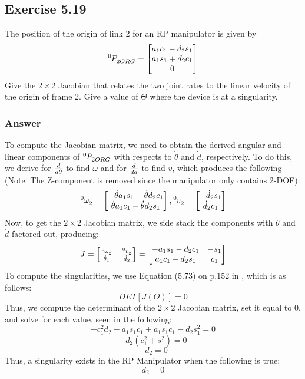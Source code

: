 \documentclass[10pt]{article}
\begin{document}
\subsection*{Exercise 5.19}
The position of the origin of link 2 for an RP manipulator is given by
\[
\tensor*[^{0}]{P}{_{2ORG}} =
\begin{bmatrix}
    a_{1}c_{1} - d_{2}s_{1}     \\
    a_{1}s_{1} + d_{2}c_{1}     \\
    0
\end{bmatrix}
\]
Give the \(2 \times 2\) Jacobian that relates the two joint rates to the linear velocity of the origin of frame {2}. Give a value of \(\Theta\) where the device is at a singularity.
\subsubsection*{Answer}
To compute the Jacobian matrix, we need to obtain the derived angular and linear components of \(\tensor*[^{0}]{P}{_{2ORG}}\) with respects to \(\dot{\theta}\) and \(\dot{d}\), respectively.  To do this, we derive for \({d}\over{d\theta}\) to find \(\omega\) and for \({d}\over{dd}\) to find \(v\), which produces the following (Note: The Z-component is removed since the manipulator only contains 2-DOF):
\[
\tensor*[^{0}]{\omega}{_{2}} =
\begin{bmatrix}
    -\dot{\theta}a_{1}s_{1} - \dot{\theta}d_{2}c_{1}     \\
    \dot{\theta}a_{1}c_{1} - \dot{\theta}d_{2}s_{1}
\end{bmatrix},
\tensor*[^{0}]{v}{_{2}} =
\begin{bmatrix}
    - \dot{d}_{2}s_{1}     \\
    \dot{d}_{2}c_{1}
\end{bmatrix}
\]
Now, to get the \(2 \times 2\) Jacobian matrix, we side stack the components with \(\dot{\theta}\) and \(\dot{d}\) factored out, producing:
\[
J =
\begin{bmatrix}
    \tensor*[^{0}]{\omega}{_{2}}  \over {\dot{\theta}_{1}}  &
    \tensor*[^{0}]{v}{_{2}} \over \dot{d}_{2}
\end{bmatrix} =
\begin{bmatrix}
    -a_{1}s_{1} - d_{2}c_{1} & -s_{1} \\
    a_{1}c_{1} - d_{2}s_{1}  & c_{1}
\end{bmatrix}
\]
To compute the singularities, we use Equation (5.73) on p.152 in \cite{textbook}, which is as follows:
\[DET[J(\Theta)] = 0\]
Thus, we compute the determinant of the \(2 \times 2\) Jacobian matrix, set it equal to 0, and solve for each value, seen in the following:
\[
-c_{1}^2d_{2} - a_{1}s_{1}c_{1} + a_{1}s_{1}c_{1} - d_{2}s_{1}^2 = 0
\]
\[
-d_{2}(c_{1}^2 + s_{1}^2) = 0
\]
\[
-d_{2} = 0
\]
Thus, a singularity exists in the RP Manipulator when the following is true:
\[
d_{2} = 0
\]
\pagebreak
\end{document}
